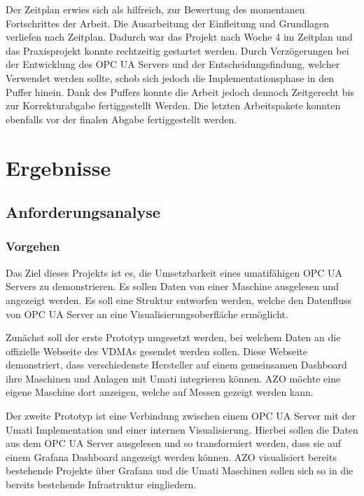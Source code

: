 \documentclass[a4paper, 12pt, oneside, toc=listofnumbered, bibliography=totoc]{scrbook}
\begin{document}
	Der Zeitplan erwies sich als hilfreich, zur Bewertung des momentanen Fortschrittes der Arbeit. Die Ausarbeitung der Einfleitung und Grundlagen verliefen nach Zeitplan. Dadurch war das Projekt nach Woche 4 im Zeitplan und das Praxisprojekt konnte rechtzeitig gestartet werden. Durch Verzögerungen bei der Entwicklung des OPC UA Servers und der Entscheidungsfindung, welcher Verwendet werden sollte, schob sich jedoch die Implementationsphase in den Puffer hinein. Dank des Puffers konnte die Arbeit jedoch dennoch Zeitgerecht bis zur Korrekturabgabe fertiggestellt Werden. Die letzten Arbeitspakete konnten ebenfalls vor der finalen Abgabe fertiggestellt werden.  
	
\chapter{Ergebnisse}\label{ch:Ergebnisse}
	
	
	\section{Anforderungsanalyse}
		
		\subsection{Vorgehen}
		Das Ziel dieses Projekts ist es, die Umsetzbarkeit eines umatifähigen OPC UA Servers zu demonstrieren. Es sollen Daten von einer Maschine ausgelesen und angezeigt werden. Es soll eine Struktur entworfen werden, welche den Datenfluss von OPC UA Server an eine Visualisierungsoberfläche ermöglicht.
		
		Zunächst soll der erste Prototyp umgesetzt werden, bei welchem Daten an die offizielle Webseite des VDMAs gesendet werden sollen. Diese Webseite demonstriert, dass verschiedenste Hersteller auf einem gemeinsamen Dashboard ihre Maschinen und Anlagen mit Umati integrieren können. AZO möchte eine eigene Maschine dort anzeigen, welche auf Messen gezeigt werden kann.
		
		Der zweite Prototyp ist eine Verbindung zwischen einem OPC UA Server mit der Umati Implementation und einer internen Visualisierung. Hierbei sollen die Daten aus dem OPC UA Server ausgelesen und so transformiert werden, dass sie auf einem Grafana Dashboard angezeigt werden können. AZO visualisiert bereits bestehende Projekte über Grafana und die Umati Maschinen sollen sich so in die bereits bestehende Infrastruktur eingliedern.
		
\end{document}
